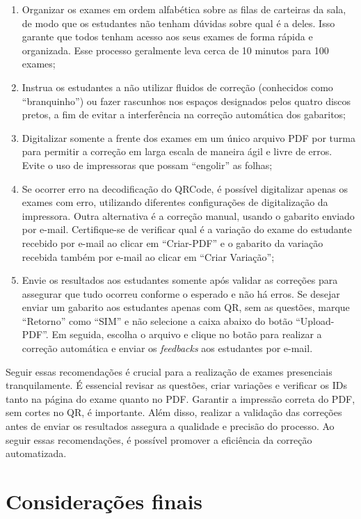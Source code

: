 \begin{enumerate}
    \item Organizar os exames em ordem alfabética sobre as filas de carteiras da sala, de modo que os estudantes não tenham dúvidas sobre qual é a deles. Isso garante que todos tenham acesso aos seus exames de forma rápida e organizada. Esse processo geralmente leva cerca de 10 minutos para 100 exames;
    \item Instrua os estudantes a não utilizar fluidos de correção (conhecidos como ``branquinho'') ou fazer rascunhos nos espaços designados pelos quatro discos pretos, a fim de evitar a interferência na correção automática dos gabaritos;
    \item Digitalizar somente a frente dos exames em um único arquivo PDF por turma para permitir a correção em larga escala de maneira ágil e livre de erros. Evite o uso de impressoras que possam ``engolir'' as folhas;
    \item Se ocorrer erro na decodificação do QRCode, é possível digitalizar apenas os exames com erro, utilizando diferentes configurações de digitalização da impressora. Outra alternativa é a correção manual, usando o gabarito enviado por e-mail. Certifique-se de verificar qual é a variação do exame do estudante recebido por e-mail ao clicar em ``Criar-PDF'' e o gabarito da variação recebida também por e-mail ao clicar em ``Criar Variação'';
    \item Envie os resultados aos estudantes somente após validar as correções para assegurar que tudo ocorreu conforme o esperado e não há erros. Se desejar enviar um gabarito aos estudantes apenas com QR, sem as questões, marque ``Retorno'' como ``SIM'' e não selecione a caixa abaixo do botão ``Upload-PDF''. Em seguida, escolha o arquivo e clique no botão para realizar a correção automática e enviar os \textit{feedbacks} aos estudantes por e-mail.
\end{enumerate}

Seguir essas recomendações é crucial para a realização de exames presenciais tranquilamente. É essencial revisar as questões, criar variações e verificar os IDs tanto na página do exame quanto no PDF. Garantir a impressão correta do PDF, sem cortes no QR, é importante. Além disso, realizar a validação das correções antes de enviar os resultados assegura a qualidade e precisão do processo. Ao seguir essas recomendações, é possível promover a eficiência da correção automatizada.

\section{Considerações finais}

